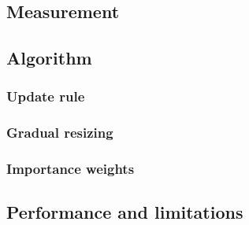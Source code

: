\subsection{Measurement}
\subsection{Algorithm}
\subsubsection{Update rule}
\subsubsection{Gradual resizing}
\subsubsection{Importance weights}
\subsection{Performance and limitations}